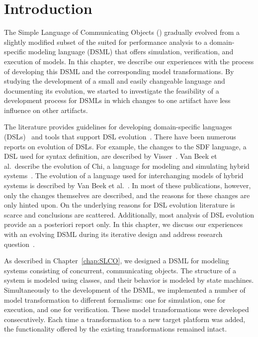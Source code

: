 \section{Introduction}
\label{sec:iterative-dsl-evolution:Introduction}

The Simple Language of Communicating Objects (\SLCO) gradually evolved from a slightly modified subset of the \UML suited for performance analysis to a domain-specific modeling language (DSML) that offers simulation, verification, and execution of models.
In this chapter, we describe our experiences with the process of developing this DSML and the corresponding model transformations.
By studying the development of a small and easily changeable language and documenting its evolution, we started to investigate the feasibility of a development process for DSMLs in which changes to one artifact have less influence on other artifacts.

The literature provides guidelines for developing domain-specific languages (DSLs)~\cite{Mernik2005,Deursen1998,Deursen2000} and tools that support DSL evolution~\cite{Geest2008,Sprinkle2004}.
There have been numerous reports on evolution of DSLs.
For example, the changes to the SDF language, a DSL used for syntax definition, are described by Visser~\cite{Vis97.thesis}.
Van Beek et al.\ describe the evolution of Chi, a language for modeling and simulating hybrid systems~\cite{Beek2008}.
The evolution of a language used for interchanging models of hybrid systems is described by Van Beek et al.~\cite{Beek2009}.
In most of these publications, however, only the changes themselves are described, and the reasons for these changes are only hinted upon.
On the underlying reasons for DSL evolution literature is scarce and conclusions are scattered.
Additionally, most analysis of DSL evolution provide an a posteriori report only.
In this chapter, we discuss our experiences with an evolving DSML during its iterative design and address research question~.

\RQFive

As described in Chapter~\ref{chap:SLCO}, we designed a DSML for modeling systems consisting of concurrent, communicating objects.
The structure of a system is modeled using classes, and their behavior is modeled by state machines.
Simultaneously to the development of the DSML, we implemented a number of model transformation to different formalisms: one for simulation, one for execution, and one for verification.
These model transformations were developed consecutively.
Each time a transformation to a new target platform was added, the functionality offered by the existing transformations remained intact.

